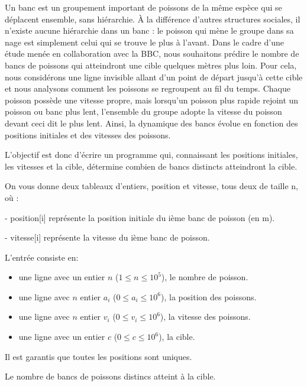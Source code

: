 \problemname{}


Un banc est un groupement important de poissons de la même espèce qui se déplacent ensemble, sans hiérarchie. À la différence d'autres structures sociales, il n'existe aucune hiérarchie dans un banc : le poisson qui mène le groupe dans sa nage est simplement celui qui se trouve le plus à l'avant.
Dans le cadre d'une étude menée en collaboration avec la BBC, nous souhaitons prédire le nombre de bancs de poissons qui atteindront une cible quelques mètres plus loin.
Pour cela, nous considérons une ligne invisible allant d'un point de départ jusqu'à cette cible et nous analysons comment les poissons se regroupent au fil du temps.
Chaque poisson possède une vitesse propre, mais lorsqu'un poisson plus rapide rejoint un poisson ou banc plus lent, l'ensemble du groupe adopte la vitesse du poisson devant ceci dit le plus lent.
Ainsi, la dynamique des bancs évolue en fonction des positions initiales et des vitesses des poissons.

L'objectif est donc d'écrire un programme qui, connaissant les positions initiales, les vitesses et la cible, détermine combien de bancs distincts atteindront la cible.

On vous donne deux tableaux d'entiers, position et vitesse, tous deux de taille n, où :

- position[i] représente la position initiale du ième banc de poisson (en m).

- vitesse[i] représente la vitesse du ième banc de poisson.

\begin{Input}
    L'entrée consiste en:
    \begin{itemize}
        \item une ligne avec un entier $n$ ($1 \leq n \leq 10^{5}$), le nombre de poisson.
        \item une ligne avec $n$ entier $a_i$ ($0 \leq a_i \leq 10^{6}$), la position des poissons.
        \item une ligne avec $n$ entier $v_i$ ($0 \leq v_i \leq 10^{6}$), la vitesse des poissons.
        \item une ligne avec un entier $c$ ($0 \leq c \leq 10^{6}$), la cible.
    \end{itemize}
    Il est garantis que toutes les positions sont uniques.
\end{Input}

\begin{Output}
   Le nombre de bancs de poissons distincs atteint à la cible.
\end{Output}
